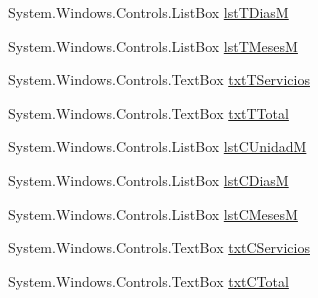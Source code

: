 \begin{DoxyCompactItemize}
\item 
System.\-Windows.\-Controls.\-List\-Box \hyperlink{class_proyecto___integrador__3_1_1_reportes_1_1_reporte_frecuencia_de_uso_aef12e55c0fc89f85f601163eda0ffac4}{lst\-T\-Dias\-M}
\item 
System.\-Windows.\-Controls.\-List\-Box \hyperlink{class_proyecto___integrador__3_1_1_reportes_1_1_reporte_frecuencia_de_uso_a54c8c7cb624219a3e3f23d61eded187b}{lst\-T\-Meses\-M}
\item 
System.\-Windows.\-Controls.\-Text\-Box \hyperlink{class_proyecto___integrador__3_1_1_reportes_1_1_reporte_frecuencia_de_uso_a64a10f33c6df7de8fee16db2bccdfdeb}{txt\-T\-Servicios}
\item 
System.\-Windows.\-Controls.\-Text\-Box \hyperlink{class_proyecto___integrador__3_1_1_reportes_1_1_reporte_frecuencia_de_uso_a220671fb7be4b6c864281288bce5fc86}{txt\-T\-Total}
\item 
System.\-Windows.\-Controls.\-List\-Box \hyperlink{class_proyecto___integrador__3_1_1_reportes_1_1_reporte_frecuencia_de_uso_ab371c0b71730bbb785efdca10a7d2d41}{lst\-C\-Unidad\-M}
\item 
System.\-Windows.\-Controls.\-List\-Box \hyperlink{class_proyecto___integrador__3_1_1_reportes_1_1_reporte_frecuencia_de_uso_a8ce6aa1fd7ce5c054b011ee702ee1d03}{lst\-C\-Dias\-M}
\item 
System.\-Windows.\-Controls.\-List\-Box \hyperlink{class_proyecto___integrador__3_1_1_reportes_1_1_reporte_frecuencia_de_uso_ad82bcab9a8b0b8d06f3c9b604da3c3be}{lst\-C\-Meses\-M}
\item 
System.\-Windows.\-Controls.\-Text\-Box \hyperlink{class_proyecto___integrador__3_1_1_reportes_1_1_reporte_frecuencia_de_uso_a9abdaf17fc6ada9d897e36cf81413c23}{txt\-C\-Servicios}
\item 
System.\-Windows.\-Controls.\-Text\-Box \hyperlink{class_proyecto___integrador__3_1_1_reportes_1_1_reporte_frecuencia_de_uso_abaf1d4ad66a8f620177fc6049ffddcbc}{txt\-C\-Total}
\end{DoxyCompactItemize}
